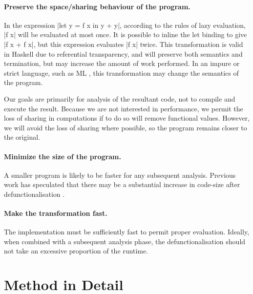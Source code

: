 \documentclass{sigplanconf}
\begin{document}
\paragraph{Preserve the space/sharing behaviour of the program.} In the expression |let y = f x in y + y|, according to the rules of lazy evaluation, |f x| will be evaluated at most once. It is possible to inline the let binding to give |f x + f x|, but this expression evaluates |f x| twice. This transformation is valid in Haskell due to referential transparency, and will preserve both semantics and termination, but may increase the amount of work performed. In an impure or strict language, such as ML \cite{ml}, this transformation may change the semantics of the program.

Our goals are primarily for analysis of the resultant code, not to compile and execute the result. Because we are not interested in performance, we permit the loss of sharing in computations if to do so will remove functional values. However, we will avoid the loss of sharing where possible, so the program remains closer to the original.

\paragraph{Minimize the size of the program.} A smaller program is likely to be faster for any subsequent analysis. Previous work has speculated that there may be a substantial increase in code-size after defunctionalisation \cite{chin:higher_order_removal}.

\paragraph{Make the transformation fast.} The implementation must be sufficiently fast to permit proper evaluation. Ideally, when combined with a subsequent analysis phase, the defunctionalisation should not take an excessive proportion of the runtime.


\section{Method in Detail}
\label{sec:detailed}

\begin{comment}
\begin{code}
data Prog = Prog deriving Eq
simplify,arity,inline,specialise :: Prog -> Prog
\end{code}
\end{comment}
\end{document}
